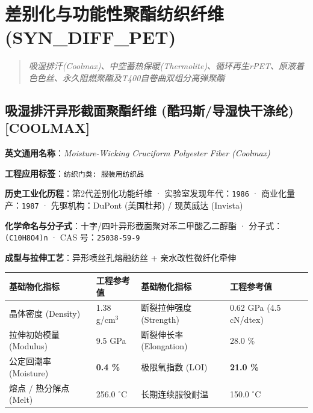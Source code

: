 \documentclass[11pt,openright,twoside,UTF8]{ctexbook}
\begin{document}
\chapter{差别化与功能性聚酯纺织纤维 (SYN\_DIFF\_PET)}
\begin{quote}
\small\itshape
吸湿排汗(Coolmax)、中空蓄热保暖(Thermolite)、循环再生rPET、原液着色色丝、永久阻燃聚酯及T400自卷曲双组分高弹聚酯
\end{quote}

\section{吸湿排汗异形截面聚酯纤维 (酷玛斯/导湿快干涤纶) [COOLMAX]}
\label{sec:coolmax}

\noindent\textbf{英文通用名称}：\textit{Moisture-Wicking Cruciform Polyester Fiber (Coolmax)}\par
\noindent\textbf{工程应用标签}：\texttt{纺织门类: 服装用纺织品}\par
\noindent\textbf{历史工业化历程}：第2代差别化功能纤维 · 实验室发现年代：\texttt{1986} · 商业化量产：\texttt{1987} · 先驱机构：DuPont (美国杜邦) / 现英威达 (Invista)\par
\noindent\textbf{化学命名与分子式}：十字/四叶异形截面聚对苯二甲酸乙二醇酯 · 分子式：\texttt{(C10H8O4)n} · CAS 号：\texttt{25038-59-9}\par
\noindent\textbf{成型与拉伸工艺}：异形喷丝孔熔融纺丝 + 亲水改性微纤化牵伸\par

\vspace{0.15cm}
\begin{center}
\small
\begin{tabularx}{\textwidth}{p{3.8cm}Xp{3.8cm}X}
\toprule
\textbf{基础物化指标} & \textbf{工程参考值} & \textbf{基础物化指标} & \textbf{工程参考值} \\
\midrule
晶体密度 (Density) & 1.38 g/cm$^3$ & 断裂拉伸强度 (Strength) & 0.62 GPa (4.5 cN/dtex) \\
拉伸初始模量 (Modulus) & 9.5 GPa & 断裂伸长率 (Elongation) & 28.0 \% \\
公定回潮率 (Moisture) & \textbf{0.4 \%} & 极限氧指数 (LOI) & \textbf{21.0 \%} \\
熔点 / 热分解点 (Melt) & 256.0 $^\circ\mathrm{C}$ & 长期连续服役耐温 & 150.0 $^\circ\mathrm{C}$ \\
\bottomrule
\end{tabularx}
\end{center}
\vspace{0.15cm}
\end{document}
